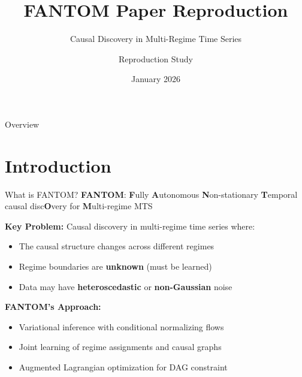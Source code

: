 \documentclass[aspectratio=169]{beamer}
\title{FANTOM Paper Reproduction}
\subtitle{Causal Discovery in Multi-Regime Time Series}
\author{Reproduction Study}
\date{January 2026}
\begin{document}
\begin{frame}
\titlepage
\end{frame}

\begin{frame}{Overview}
\tableofcontents
\end{frame}

\section{Introduction}

\begin{frame}{What is FANTOM?}
\textbf{FANTOM}: \textbf{F}ully \textbf{A}utonomous \textbf{N}on-stationary \textbf{T}emporal causal disc\textbf{O}very for \textbf{M}ulti-regime MTS

\vspace{0.5cm}
\textbf{Key Problem:} Causal discovery in multi-regime time series where:
\begin{itemize}
    \item The causal structure changes across different regimes
    \item Regime boundaries are \textbf{unknown} (must be learned)
    \item Data may have \textbf{heteroscedastic} or \textbf{non-Gaussian} noise
\end{itemize}

\vspace{0.5cm}
\textbf{FANTOM's Approach:}
\begin{itemize}
    \item Variational inference with conditional normalizing flows
    \item Joint learning of regime assignments and causal graphs
    \item Augmented Lagrangian optimization for DAG constraint
\end{itemize}
\end{frame}
\end{document}
